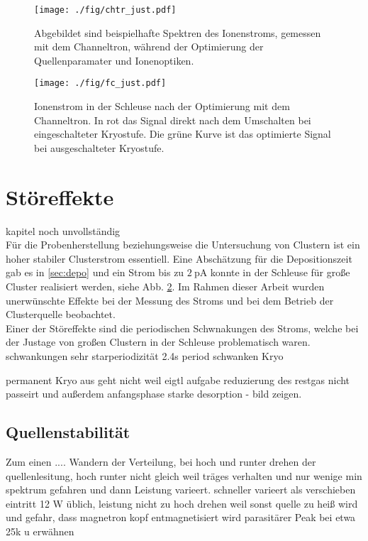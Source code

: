 \begin{figure}
  \centering
  \texttt{[image: ./fig/chtr\_just.pdf]}
  \caption{Abgebildet sind beispielhafte Spektren des Ionenstroms, gemessen mit dem Channeltron, während der Optimierung der Quellenparamater und Ionenoptiken.}
  \label{fig:chtr_just}
\end{figure}
\begin{figure}
  \centering
  \texttt{[image: ./fig/fc\_just.pdf]}
  \caption{Ionenstrom in der Schleuse nach der Optimierung mit dem Channeltron. In rot das Signal direkt nach dem Umschalten bei eingeschalteter Kryostufe. Die grüne Kurve ist das optimierte Signal bei ausgeschalteter Kryostufe.}
  \label{fig:fc_just}
\end{figure}




\section{Störeffekte}
\label{sec:effekte}
kapitel noch unvollständig\\
Für die Probenherstellung beziehungsweise die Untersuchung von Clustern ist ein hoher stabiler Clusterstrom essentiell.
Eine Abschätzung für die Depositionszeit gab es in \ref{sec:depo} und ein Strom bis zu $\SI{2}{\pA}$ konnte in der Schleuse für große Cluster realisiert werden, siehe Abb. \ref{fig:fc_just}.
Im Rahmen dieser Arbeit wurden unerwünschte Effekte bei der Messung des Stroms und bei dem Betrieb der Clusterquelle beobachtet.\\

Einer der Störeffekte sind die periodischen Schwnakungen des Stroms, welche bei der Justage von großen Clustern in der Schleuse problematisch waren.
schwankungen sehr starperiodizität 2.4s
period schwanken Kryo

permanent Kryo aus geht nicht weil eigtl aufgabe reduzierung des restgas nicht passeirt und außerdem anfangsphase starke desorption - bild zeigen.

\subsection{Quellenstabilität}
\label{sec:leistung}
Zum einen ....
Wandern der Verteilung, bei hoch und runter drehen der quellenlesitung, hoch runter nicht gleich weil träges verhalten und nur wenige min spektrum gefahren und dann Leistung varieert. schneller varieert als verschieben eintritt
12 W üblich, leistung nicht zu hoch drehen weil sonst quelle zu heiß wird und gefahr, dass magnetron kopf entmagnetisiert wird
parasitärer Peak bei etwa 25k u erwähnen \cite{gust}

